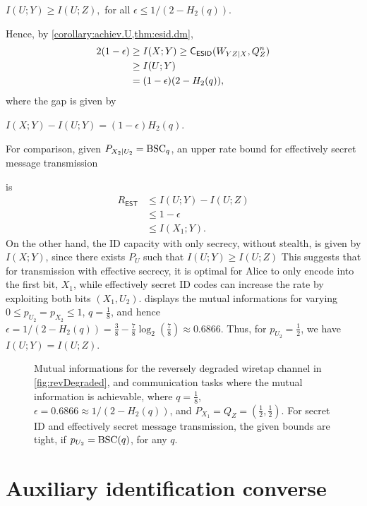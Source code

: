 \documentclass[conference,final]{IEEEtran}
\begin{document}
$
  I(U; Y) \ge I(U; Z),
$
for all $\epsilon \le 1/(2 - H_2(q))$.


Hence, by \cref{corollary:achiev.U,thm:esid.dm},
\begin{align}
  2(1 - \epsilon)
    & \ge I(X; Y)
  \ge \textsf{C}_\textsf{ESID}(W_{YZ|X}, Q_Z^n)
  \\& \ge I(U; Y)
  \\& = (1-\epsilon) (2 - H_2(q)),
\end{align}
where the gap is given by

$
  I(X; Y) - I(U; Y) = (1-\epsilon) H_2(q).
$

For comparison, given $P_{X_2|U_2} = \operatorname{BSC}_q$,
an upper rate bound
for effectively secret message transmission

is
\cite[Theorem~1.1]{HouKramerBloch2017EffectiveSecrecyReliability}
\begin{align}
  R_{\mathsf{EST}}
    & \le I(U; Y) - I(U; Z)
  \\& \le 1 - \epsilon
  \\& \le I(X_1; Y).
\end{align}
On the other hand, the ID capacity with only secrecy,
without stealth, is given by $I(X; Y)$, since there exists $P_U$
such that $I(U; Y) \ge I(U;Z)$
This suggests that for transmission with effective secrecy,
it is optimal for Alice to only encode into the first bit, $X_1$,
while effectively secret ID codes can increase the rate
by exploiting both bits $(X_1, U_2)$.
displays the mutual informations for varying $0 \le p_{U_2} = p_{X_2} \le 1$,
$q = \frac{1}{8}$, and hence
$\epsilon = 1/(2 - H_2(q)) = \frac 3 8 -\frac 7 8 \log_2(\frac 7 8) \approx 0.6866$. Thus, for $p_{U_2} = \frac{1}{2}$,
we have $I(U; Y) = I(U; Z)$.

\begin{figure}
    \centering
    \caption{\label{fig:mutInfsRevDegraded}
      Mutual informations for the reversely degraded wiretap channel
      in \cref{fig:revDegraded}, and communication tasks
      where the mutual information is achievable,
      where $q = \frac{1}{8}$, $\epsilon = 0.6866 \approx 1/(2-H_2(q))$,
      and $P_{X_1} = Q_Z = (\frac 1 2,\frac 1 2)$.
      For secret ID and effectively secret message transmission,
      the given bounds are tight, if $p_{U_2} = \operatorname{BSC}(q)$, for any $q$.
    }
\end{figure}

\section{Auxiliary identification converse}
\label{sec:auxResults}
\end{document}
